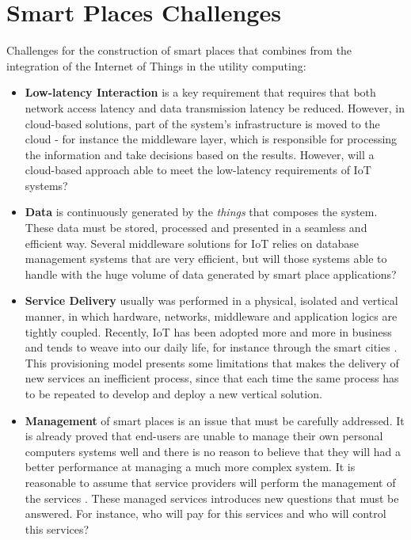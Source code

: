 \section{Smart Places Challenges}
\label{section:challenges}
Challenges \cite{caceres2012ubicomp} for the construction of smart places that combines from
the integration of the Internet of Things in the utility computing:

\begin{itemize}
  \item \textbf{Low-latency Interaction} is a key requirement that requires that both network access
  latency and data transmission latency be reduced. However, in cloud-based solutions, part of the
  system's infrastructure is moved to the cloud - for instance the middleware layer, which is responsible
  for processing the information and take decisions based on the results. However, will a cloud-based
  approach able to meet the low-latency requirements of \gls{IoT} systems?
  \item \textbf{Data} is continuously generated by the \textit{things} that composes the system.
  These data must be stored, processed and presented in a seamless and efficient way. Several
  middleware solutions for \gls{IoT} \cite{floerkemeier2007rfid}\cite{eisenhauer2010hydra}\cite{de2008socrades}
  relies on database management systems that are very efficient, but will those systems able to
  handle with the huge volume of data generated by smart place applications?
  \item \textbf{Service Delivery} usually was performed in a physical, isolated and vertical
  manner, in which hardware, networks, middleware and application logics are tightly coupled. Recently,
  \gls{IoT} has been adopted more and more in business and tends to weave into our daily life, for instance
  through the smart cities \cite{caragliu2011smart}\cite{schaffers2011smart}. This provisioning model presents some
  limitations that makes the delivery of new services an inefficient process, since that each time the
  same process has to be repeated to develop and deploy a new vertical solution.
  \item \textbf{Management} of smart places is an issue that must be carefully addressed. It is already
  proved that end-users are unable to manage their own personal computers systems well \cite{doll1988measurement}
  and there is no reason to believe that they will had a better performance at managing a much more
  complex system. It is reasonable to assume that service providers will perform the management of
  the services . These managed services introduces new questions that must be answered. For instance,
  who will pay for this services and who will control this services?
\end{itemize}

